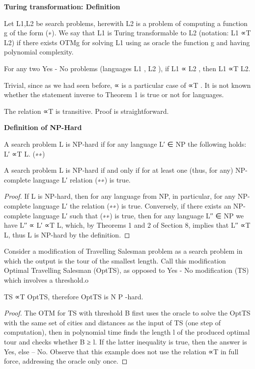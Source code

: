 \textbf{Turing transformation: Definition}\\
\begin{definition}
    Let L1,L2 be search problems,
    herewith L2 is a problem of computing
    a function g of the form (∗).
    We say that L1 is Turing transformable to L2
    (notation: L1 ∝T L2)
    if there exists OTMg for solving L1
    using as oracle the function g and having polynomial complexity.
\end{definition}

\begin{theorem}
    For any two Yes - No problems (languages L1 , L2 ), if L1 ∝ L2 , then L1 ∝T L2.
\begin{theorem}

Trivial, since as we had seen before, ∝ is a particular case of ∝T .
It is not known whether the statement inverse to Theorem 1 is true or not for languages.

\begin{theorem}
    The relation ∝T is transitive.
    Proof is straightforward.
\end{theorem}

\textbf{Definition of NP-Hard}\\
\begin{definition}
    A search problem L is NP-hard if for any language L′ ∈ NP the following holds: L′ ∝T L. (∗∗)
\end{definition}
\begin{theorem}
    A search problem L is NP-hard if and only if for at least one (thus, for any)
    NP-complete language L′ relation (∗∗) is true.
\end{theorem}
\begin{proof}
    If L is NP-hard, then for any language from NP, in particular, for any NP- complete language L′ the relation (∗∗) is true.
    Conversely, if there exists an NP-complete language L′ such that (∗∗) is true, then for any language L′′ ∈ NP we have
    L′′ ∝ L′ ∝T L,
    which, by Theorems 1 and 2 of Section 8, implies that L′′ ∝T L, thus L is NP-hard by
    the definition.
\end{proof}
\begin{example}
    Consider a modification of Travelling Salesman problem as a search problem in which the output is the tour of the smallest length. Call this modification Optimal Travelling Salesman (OptTS), as opposed to Yes - No modification (TS) which involves a threshold.o
\end{example}

\end{theorem}
    TS ∝T OptTS, therefore OptTS is N P -hard.
\end{theorem}

\begin{proof}
    The OTM for TS with threshold B first uses the oracle to solve the OptTS with the same set of cities and distances as the input of TS (one step of computation), then in polynomial time finds the length l of the produced optimal tour and checks whether B ≥ l. If the latter inequality is true, then the answer is Yes, else – No.
Observe that this example does not use the relation ∝T in full force, addressing the oracle only once.
\end{proof}
